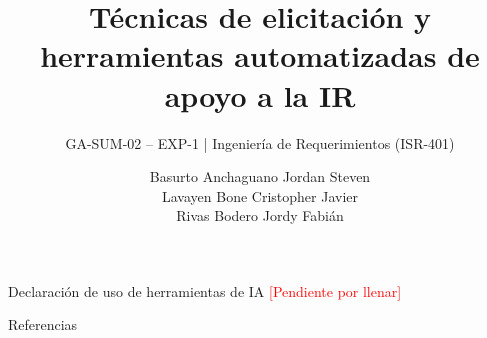 \documentclass[aspectratio=169,11pt]{beamer}
\title{Técnicas de elicitación y herramientas automatizadas de apoyo a la IR}
\subtitle{GA-SUM-02 -- EXP-1 \;|\; Ingeniería de Requerimientos (ISR-401)}
\author{Basurto Anchaguano Jordan Steven \\ Lavayen Bone Cristopher Javier \\ Rivas Bodero Jordy Fabián}
\institute{Universidad Técnica Estatal de Quevedo -- Carrera de Software}
\date{}
\begin{document}
\begin{frame}
  \titlepage
\end{frame}







\begin{frame}{Declaración de uso de herramientas de IA}
  \textcolor{red}{[Pendiente por llenar]}
\end{frame}

\begin{frame}[allowframebreaks]{Referencias}
  \footnotesize
  
  
\end{frame}
\end{document}
